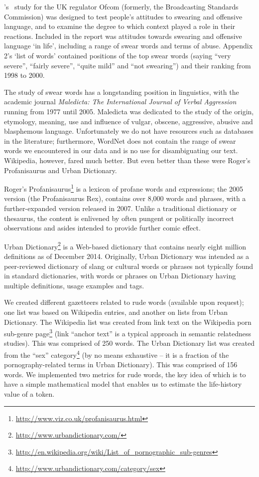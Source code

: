 \documentclass[letterpaper]{article}
\begin{document}
\citeauthor{millwood-hargrave:2000}'s~
study for the UK regulator Ofcom (formerly, the Broadcasting Standards
Commission) was designed to test people’s attitudes to swearing and
offensive language, and to examine the degree to which context played
a role in their reactions. Included in the report was attitudes
towards swearing and offensive language `in life', including a range
of swear words and terms of abuse. Appendix 2’s `list of words'
contained positions of the top swear words (saying ``very severe'',
``fairly severe'', ``quite mild'' and ``not swearing'') and their
ranking from 1998 to 2000.

The study of swear words has a longstanding position in linguistics,
with the academic journal {\emph{Maledicta: The International Journal of
Verbal Aggression}} running from 1977 until 2005. Maledicta was
dedicated to the study of the origin, etymology, meaning, use and
influence of vulgar, obscene, aggressive, abusive and blasphemous
language. Unfortunately we do not have resources such as databases in
the literature; furthermore, WordNet does not contain the range of
swear words we encountered in our data and is no use for disambiguating
our text. Wikipedia, however, fared much better. But even better than
these were Roger's Profanisaurus and Urban Dictionary.

Roger's
Profanisaurus\footnote{\url{http://www.viz.co.uk/profanisaurus.html}}
is a lexicon of profane words and expressions; the 2005 version (the
Profanisaurus Rex), contains over 8,000 words and phrases, with a
further-expanded version released in 2007. Unlike a traditional
dictionary or thesaurus, the content is enlivened by often pungent or
politically incorrect observations and asides intended to provide
further comic effect.

Urban Dictionary\footnote{\url{http://www.urbandictionary.com/}} is a
Web-based dictionary that contains nearly eight million definitions as
of December 2014. Originally, Urban Dictionary was intended as a
peer-reviewed dictionary of slang or cultural words or phrases not
typically found in standard dictionaries, with words or phrases on
Urban Dictionary having multiple definitions, usage examples and tags.

We created different gazetteers related to rude words (available upon
request); one list was based on Wikipedia entries, and another on
lists from Urban Dictionary. The Wikipedia list was created from link
text on the Wikipedia porn sub-genre
page\footnote{\url{http://en.wikipedia.org/wiki/List_of_pornographic_sub-genres}}
(link ``anchor text'' is a typical approach in semantic relatedness
studies). This was comprised of 250 words. The Urban Dictionary list
was created from the ``sex''
category\footnote{\url{http://www.urbandictionary.com/category/sex}}
(by no means exhaustive -- it is a fraction of the pornography-related
terms in Urban Dictionary). This was comprised of 156 words. We
implemented two metrics for rude words, the key idea of which is to
have a simple mathematical model that enables us to estimate the
life-history value of a token.\\
\end{document}
